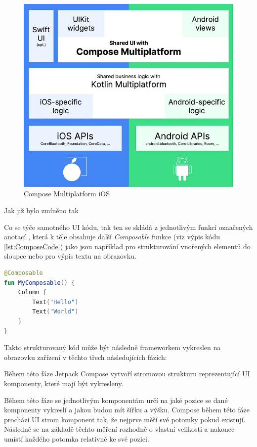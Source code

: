 \begin{figure}[H]
  \centering
  \includegraphics[width=.7\textwidth]{composeIOS.png}
  \caption{Compose Multiplatform iOS}
  \label{fig:composeIOS}
\end{figure}

Jak již bylo zmíněno tak 



Co se týče samotného UI kódu, tak ten se skládá z jednotlivým funkcí označených anotací , která k těle obsahuje další
\textit{Composable} funkce (viz výpis kódu \ref{lst:ComposeCode}) jako jsou například  pro strukturování vnořených elementů do sloupce nebo  pro výpis
textu na obrazovku. 


\begin{lstlisting}[caption={Popis UI widgetů pomocí jazyka Kotlin}, label={lst:ComposeCode}, language=Kotlin]
@Composable
fun MyComposable() {
    Column {
        Text("Hello")
        Text("World")
    }
}
\end{lstlisting}

Takto strukturovaný kód může být následně frameworkem vykreslen na obrazovku zařízení v těchto třech následujících fázích:

Během této fáze Jetpack Compose vytvoří stromovou strukturu reprezentující UI komponenty, které mají být vykresleny.\cite{jetpackPhases}

Během této fáze se jednotlivým komponentám určí na jaké pozice se dané komponenty vykreslí a jakou budou mít šířku a výšku.
Compose během této fáze prochází UI strom komponent tak, že nejprve měří své potomky pokud existují. Následně se na základě těchto
měření rozhodně o vlastní velikosti a nakonec umístí každého potomka relativně ke své pozici.\cite{jetpackPhases}

